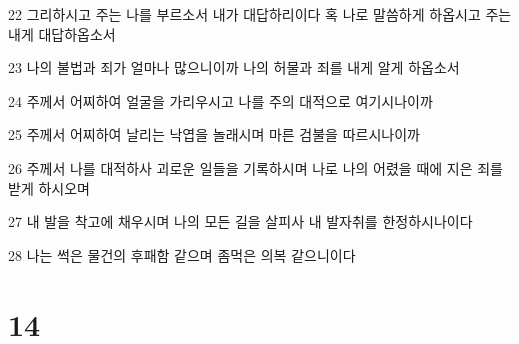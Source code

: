 \par 22 그리하시고 주는 나를 부르소서 내가 대답하리이다 혹 나로 말씀하게 하옵시고 주는 내게 대답하옵소서
\par 23 나의 불법과 죄가 얼마나 많으니이까 나의 허물과 죄를 내게 알게 하옵소서
\par 24 주께서 어찌하여 얼굴을 가리우시고 나를 주의 대적으로 여기시나이까
\par 25 주께서 어찌하여 날리는 낙엽을 놀래시며 마른 검불을 따르시나이까
\par 26 주께서 나를 대적하사 괴로운 일들을 기록하시며 나로 나의 어렸을 때에 지은 죄를 받게 하시오며
\par 27 내 발을 착고에 채우시며 나의 모든 길을 살피사 내 발자취를 한정하시나이다
\par 28 나는 썩은 물건의 후패함 같으며 좀먹은 의복 같으니이다

\chapter{14}

